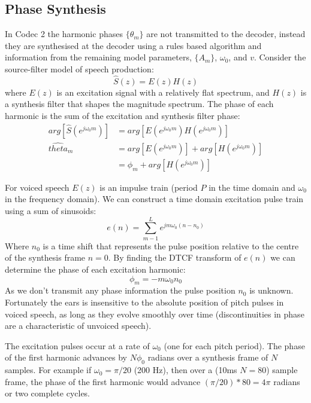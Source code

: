 \documentclass{article}
\begin{document}
\subsection{Phase Synthesis}

In Codec 2 the harmonic phases $\{\theta_m\}$ are not transmitted to the decoder, instead they are synthesised at the decoder using a rules based algorithm and information from the remaining model parameters, $\{A_m\}$, $\omega_0$, and $v$.  Consider the source-filter model of speech production:
\begin{equation}
\hat{S}(z)=E(z)H(z)
\end{equation}
where $E(z)$ is an excitation signal with a relatively flat spectrum, and $H(z)$ is a synthesis filter that shapes the magnitude spectrum.  The phase of each harmonic is the sum of the excitation and synthesis filter phase:
\begin{equation}
\begin{split}
arg \left[ \hat{S}(e^{j \omega_0 m}) \right] &= arg \left[ E(e^{j \omega_0 m}) H(e^{j \omega_0 m}) \right] \\
\hat{theta}_m &= arg \left[ E(e^{j \omega_0 m}) \right] + arg \left[ H(e^{j \omega_0 m}) \right] \\
&= \phi_m +  arg \left[ H(e^{j \omega_0 m}) \right]
\end{split}
\end{equation}

For voiced speech $E(z)$ is an impulse train (period $P$ in the time domain and $\omega_0$ in the frequency domain).  We can construct a time domain excitation pulse train using a sum of sinusoids:
\begin{equation}
e(n) = \sum_{m-1}^L e^{j m \omega_0 (n - n_0)}
\end{equation}
Where $n_0$ is a time shift that represents the pulse position relative to the centre of the synthesis frame $n=0$. By finding the DTCF transform of $e(n)$ we can determine the phase of each excitation harmonic:
\begin{equation}
\phi_m = - m \omega_0 n_0
\end{equation}
As we don't transmit any phase information the pulse position $n_0$ is unknown.  Fortunately the ears is insensitive to the absolute position of pitch pulses in voiced speech, as long as they evolve smoothly over time (discontinuities in phase are a characteristic of unvoiced speech).

The excitation pulses occur at a rate of $\omega_0$ (one for each pitch period). The phase of the first harmonic advances by $N \phi_0$ radians over a synthesis frame of $N$ samples.  For example if $\omega_0 = \pi /20$ (200 Hz), then over a (10ms $N=80$) sample frame, the phase of the first harmonic would advance $(\pi/20)*80 = 4 \pi$ radians or two complete cycles.
\end{document}
